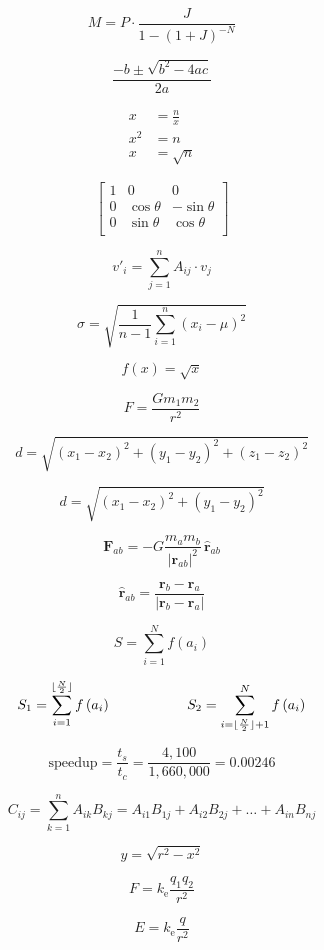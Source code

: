 \documentclass[12pt]{article}
\begin{document}
$$
M = P \cdot \frac{J}{1 - (1 + J)^{-N}}
$$

$$
\frac{-b \pm \sqrt{b^2 - 4ac}}{2a}
$$


\begin{align*}
x &= \frac{n}{x} \\
x^2 &= n \\
x &= \sqrt{n}
\end{align*}

$$
\begin{bmatrix}
1 & 0 & 0 \\
0 & \cos \theta & -\sin \theta \\
0 & \sin \theta  & \cos \theta \\
\end{bmatrix}
$$

$$
v'_i = \sum_{j = 1}^n A_{ij}\cdot v_j
$$

$$
\sigma = \sqrt{\frac{1}{n - 1}\sum_{i = 1}^n (x_i - \mu)^2}
$$

$$
f(x) = \sqrt{x}
$$

$$
F = \frac{Gm_1m_2}{r^2}
$$

$$
d = \sqrt{(x_1 - x_2)^2 + (y_1 - y_2)^2 + (z_1 -  z_2)^2}
$$

$$
d = \sqrt{(x_1 - x_2)^2+(y_1 - y_2)^2}
$$

$$
\mathbf{F}_{ab} = - G \frac{m_a m_b}{{\vert \mathbf{r}_{ab} \vert}^2} \, \mathbf{\hat{r}}_{ab}
$$

$$
\mathbf{\hat{r}}_{ab} = \frac{\mathbf{r}_b - \mathbf{r}_a}{\vert\mathbf{r}_b - \mathbf{r}_a\vert}
$$

$$
S = \sum_{i=1}^N f\left(a_i\right)
$$

$$
S_1 = \sum_{i=1}^{\lfloor \frac{N}{2}\rfloor } f\left(a_i\right)\hspace{.75in}
S_2 = \sum_{i=\lfloor \frac{N}{2} \rfloor +1}^{N} f\left(a_i\right)
$$

$$
\mbox{speedup}=\frac{t_s}{t_c} = \frac{4,100}{1,660,000} = 0.00246
$$

$$
C_{ij} = \sum_{k = 1}^n A_{ik}B_{kj} = A_{i1}B_{1j} + A_{i2}B_{2j} + \ldots + A_{in}B_{nj}
$$

$$
y = \sqrt{r^2 - x^2}
$$

$$
F = k_\mathrm{e} \frac{q_1q_2}{r^2}
$$

$$
E = k_\mathrm{e} \frac{q}{r^2}
$$
\end{document}
